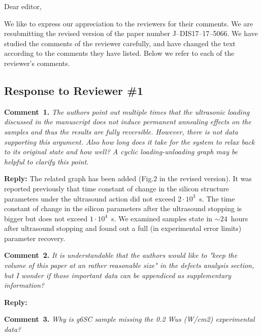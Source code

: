 \documentclass[aip,jap,preprint]{revtex4-1}
\begin{document}
Dear editor,

We like to express our appreciation to the reviewers for their comments.
We are resubmitting the revised version of the paper number J--DIS17--17--5066.
We have studied the comments of the reviewer carefully, and have changed the text according to the comments they
have listed.
Below we refer to each of the reviewer’s comments.



\subsection*{Response to Reviewer \#1 }

\noindent
\textcolor[rgb]{0.00,0.50,1.00}{\textbf{Comment~1.}}
\emph{The authors point out multiple times that the ultrasonic loading discussed in the manuscript does not induce permanent annealing effects on the samples and thus the results are fully reversible.
However, there is not data supporting this argument.
Also how long does it take for the system to relax back to its original state and how well?
A cyclic loading-unloading graph may be helpful to clarify this point.}

\noindent
\textcolor[rgb]{0.51,0.00,0.00}{\textbf{Reply:}}
The related graph has been added (Fig.2 in the revised version).
It was reported previously\cite{Ostapenko1995,YOlikhTPL2011,Olikh:Ultras,Olikh2011Sem,Ostrovskii2001,OlikhPSS} that time constant of change in the silicon structure parameters under the ultrasound action  did not exceed $2\cdot10^3$~s.
The time constant of change in the silicon parameters after the ultrasound stopping is bigger but does not exceed $1\cdot10^4$~s\cite{OlikhPSS}.
We examined samples state in $\sim24$~hours after ultrasound stopping and found out a full (in experimental error limits) parameter recovery.



\vspace{1cm}
\noindent
\textcolor[rgb]{0.00,0.50,1.00}{\textbf{Comment~2.}}
\emph{It is understandable that the authors would like to "keep the volume of this paper at an rather reasonable size" in the defects analysis section, but I wonder if those important data can be appendiced as supplementary information?}

\noindent
\textcolor[rgb]{0.51,0.00,0.00}{\textbf{Reply:}}


\vspace{1cm}
\noindent
\textcolor[rgb]{0.00,0.50,1.00}{\textbf{Comment~3.}}
\emph{ Why is g6SC sample missing the 0.2 Wus (W/cm2) experimental data?}
\end{document}
